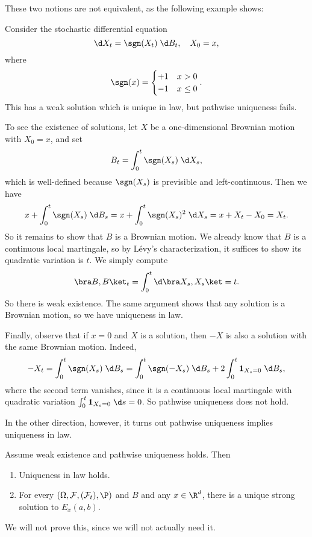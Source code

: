 \documentclass[a4paper]{article}
\begin{document}
These two notions are not equivalent, as the following example shows:
\begin{eg}[Tanaka]
  Consider the stochastic differential equation
  \[
    \d X_t = \sgn(X_t) \;\d B_t,\quad X_0 = x,
  \]
  where
  \[
    \sgn(x) =
    \begin{cases}
      +1 & x > 0\\
      -1 & x \leq 0
    \end{cases}.
  \]
  This has a weak solution which is unique in law, but pathwise uniqueness fails.

  To see the existence of solutions, let $X$ be a one-dimensional Brownian motion with $X_0 = x$, and set
  \[
    B_t = \int_0^t \sgn(X_s) \;\d X_s,
  \]
  which is well-defined because $\sgn(X_s)$ is previsible and left-continuous. Then we have
  \[
    x + \int_0^t \sgn(X_s)\;\d B_s = x + \int_0^t \sgn(X_s)^2 \;\d X_s = x + X_t - X_0 = X_t.
  \]
  So it remains to show that $B$ is a Brownian motion. We already know that $B$ is a continuous local martingale, so by L\'evy's characterization, it suffices to show its quadratic variation is $t$. We simply compute
  \[
    \bra B, B\ket_t = \int_0^t \d \bra X_s, X_s\ket = t.
  \]
  So there is weak existence. The same argument shows that any solution is a Brownian motion, so we have uniqueness in law.

  Finally, observe that if $x = 0$ and $X$ is a solution, then $-X$ is also a solution with the same Brownian motion. Indeed,
  \[
    -X_t = \int_0^t \sgn(X_s) \;\d B_s = \int_0^t \sgn(-X_s)\;\d B_s + 2 \int_0^t \mathbf{1}_{X_s = 0} \;\d B_s,
  \]
  where the second term vanishes, since it is a continuous local martingale with quadratic variation $\int_0^t \mathbf{1}_{X_s = 0} \;\d s = 0$. So pathwise uniqueness does not hold.
\end{eg}

In the other direction, however, it turns out pathwise uniqueness implies uniqueness in law.
\begin{thm}
  Assume weak existence and pathwise uniqueness holds. Then
  \begin{enumerate}
    \item Uniqueness in law holds.
    \item For every $(\Omega, \mathcal{F}, (\mathcal{F}_t), \P)$ and $B$ and any $x \in \R^d$, there is a unique strong solution to $E_x(a, b)$.\fakeqed
  \end{enumerate}
\end{thm}
We will not prove this, since we will not actually need it.
\end{document}
